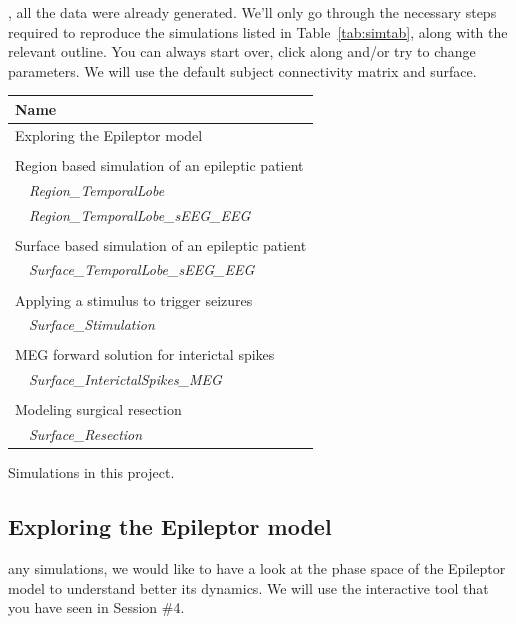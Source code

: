 \documentclass{tufte-handout}
\begin{document}
, all the data were already generated. We'll only go through the necessary steps 
required to reproduce the simulations listed in Table~\ref{tab:simtab}, along with the relevant outline.
You can always start over, click along and/or try to change parameters.
We will use the default subject connectivity matrix and surface.


\begin{margintable}
  \centering
  \selectfont
  \begin{tabular}{l}
    \toprule
    Name \\
    \midrule
    Exploring the Epileptor model\\
    \\
    Region based simulation of an epileptic patient \\
    $\quad$\textit{Region\_TemporalLobe} \\
    $\quad$\textit{Region\_TemporalLobe\_sEEG\_EEG}  \\
    \\
    Surface based simulation of an epileptic patient \\
    $\quad$\textit{Surface\_TemporalLobe\_sEEG\_EEG}  \\
    \\
    Applying a stimulus to trigger seizures \\
    $\quad$\textit{Surface\_Stimulation}  \\ 
    \\
    MEG forward solution for interictal spikes \\
    $\quad$\textit{Surface\_InterictalSpikes\_MEG} \\
    \\
    Modeling surgical resection\\
    $\quad$\textit{Surface\_Resection} \\
    \bottomrule
  \end{tabular}
  \caption{Simulations in this project.}
  \label{tab:simtab}
\end{margintable}


\subsection{Exploring the Epileptor model}\label{sec:epileptor}


 any simulations, we would like to have a look at the phase space of the Epileptor model
to understand better its dynamics. We will use the interactive tool that you have seen in Session \#4.
\end{document}
